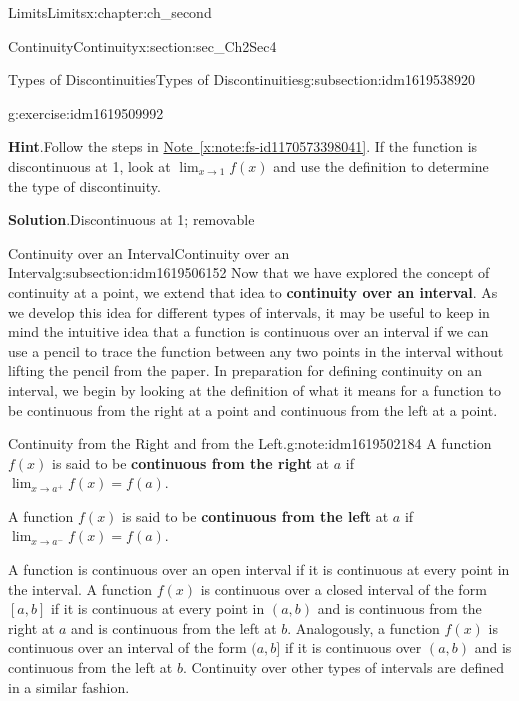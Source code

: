 \documentclass[oneside,10pt,]{book}
\newcommand{\blocktitlefont}{\relax}
\newcommand{\xreffont}{\relax}
\newcommand{\terminology}[1]{\textbf{#1}}
\numberwithin{equation}{section}
\begin{document}
\begin{chapterptx}{Limits}{}{Limits}{}{}{x:chapter:ch_second}
\begin{sectionptx}{Continuity}{}{Continuity}{}{}{x:section:sec_Ch2Sec4}
\begin{subsectionptx}{Types of Discontinuities}{}{Types of Discontinuities}{}{}{g:subsection:idm1619538920}
\begin{inlineexercise}{}{g:exercise:idm1619509992}
\par\smallskip%
\noindent\textbf{\blocktitlefont Hint}.\hypertarget{g:hint:idm1619504616}{}\quad{}Follow the steps in \hyperref[x:note:fs-id1170573398041]{Note~{\xreffont\ref{x:note:fs-id1170573398041}}}. If the function is discontinuous at 1, look at \(\lim_{x\to 1}f(x)\) and use the definition to determine the type of discontinuity.%
\par\smallskip%
\noindent\textbf{\blocktitlefont Solution}.\hypertarget{g:solution:idm1619506024}{}\quad{}Discontinuous at 1; removable%
\end{inlineexercise}%
\end{subsectionptx}
%
%
\typeout{************************************************}
\typeout{************************************************}
%
\begin{subsectionptx}{Continuity over an Interval}{}{Continuity over an Interval}{}{}{g:subsection:idm1619506152}
Now that we have explored the concept of continuity at a point, we extend that idea to \terminology{continuity over an interval}. As we develop this idea for different types of intervals, it may be useful to keep in mind the intuitive idea that a function is continuous over an interval if we can use a pencil to trace the function between any two points in the interval without lifting the pencil from the paper. In preparation for defining continuity on an interval, we begin by looking at the definition of what it means for a function to be continuous from the right at a point and continuous from the left at a point.%
\begin{note}{Continuity from the Right and from the Left.}{g:note:idm1619502184}%
A function \(f(x)\) is said to be \terminology{continuous from the right} at \(a\) if \(\lim_{x\to a^+}f(x)=f(a).\)%
\par
A function \(f(x)\) is said to be \terminology{continuous from the left} at \(a\) if \(\lim_{x\to a^-}f(x)=f(a).\)%
\end{note}
A function is continuous over an open interval if it is continuous at every point in the interval. A function \(f(x)\) is continuous over a closed interval of the form \([a,b]\) if it is continuous at every point in \((a,b)\) and is continuous from the right at \(a\) and is continuous from the left at \(b\). Analogously, a function \(f(x)\) is continuous over an interval of the form \((a,b]\) if it is continuous over \((a,b)\) and is continuous from the left at \(b\). Continuity over other types of intervals are defined in a similar fashion.%

\end{subsectionptx}
\end{sectionptx}
\end{chapterptx}
\end{document}
